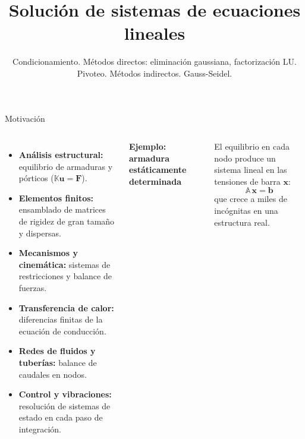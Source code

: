 \documentclass[9pt, aspectratio=169]{beamer}
\title{Solución de sistemas de ecuaciones lineales}
\subtitle{Condicionamiento. Métodos directos: eliminación gaussiana, factorización LU. Pivoteo. Métodos indirectos. Gauss-Seidel.}
\begin{document}
\maketitle

\begin{frame}{Motivación}

	\begin{columns}[t]
		\begin{itemize}
			\item \textbf{Análisis estructural:} equilibrio de armaduras y pórticos ($\mathbb{K} \bm{u} = \bm{F}$).
			\item \textbf{Elementos finitos:} ensamblado de matrices de rigidez de gran tamaño y dispersas.
			\item \textbf{Mecanismos y cinemática:} sistemas de restricciones y balance de fuerzas.
			\item \textbf{Transferencia de calor:} diferencias finitas de la ecuación de conducción.
			\item \textbf{Redes de fluidos y tuberías:} balance de caudales en nodos.
			\item \textbf{Control y vibraciones:} resolución de sistemas de estado en cada paso de integración.
		\end{itemize}

		\textbf{Ejemplo: armadura estáticamente determinada}

		\begin{center}
		\end{center}

		El equilibrio en cada nodo produce un sistema lineal en las tensiones de barra $\bm{x}$:
		\[ \mathbb{A} \, \bm{x} = \bm{b} \]
		que crece a miles de incógnitas en una estructura real.

	\end{columns}
\end{frame}
\end{document}
